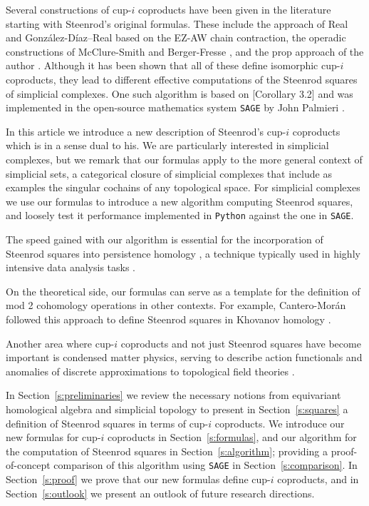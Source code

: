 Several constructions of cup-$i$ coproducts have been given in the literature starting with Steenrod's original formulas.
These include the approach of Real \cite{real1996computability} and Gonz\'alez-D\'iaz--Real \cite{gonzalez1999combinatorial, gonzalez2003computation, gonzalez2005hpt} based on the EZ-AW chain contraction, the operadic constructions of McClure-Smith \cite{mcclure03cochain} and Berger-Fresse \cite{berger04combinatorial}, and the prop approach of the author \cite{medina2020prop1, medina2018prop2}.
Although it has been shown \cite{medina2018axiomatic} that all of these define isomorphic cup-$i$ coproducts, they lead to different effective computations of the Steenrod squares of simplicial complexes.
One such algorithm is based on \cite{gonzalez1999combinatorial}[Corollary 3.2] and was implemented in the open-source mathematics system \verb|SAGE| by John Palmieri \cite{sagemath}.

In this article we introduce a new description of Steenrod's cup-$i$ coproducts which is in a sense dual to his.
We are particularly interested in simplicial complexes, but we remark that our formulas apply to the more general context of simplicial sets, a categorical closure of simplicial complexes that include as examples the singular cochains of any topological space.
For simplicial complexes we use our formulas to introduce a new algorithm computing Steenrod squares, and loosely test it performance implemented in \verb|Python| against the one in \verb|SAGE|.

The speed gained with our algorithm is essential for the incorporation of Steenrod squares into persistence homology \cite{medina2018persistence}, a technique typically used in highly intensive data analysis tasks \cite{carlsson2009topology, lee2018nanoporous, bauer2019ripser, medina2020giottotda}.

On the theoretical side, our formulas can serve as a template for the definition of mod 2 cohomology operations in other contexts.
For example, Cantero-Mor\'an followed this approach to define Steenrod squares in Khovanov homology \cite{cantero2020khovanov}.

Another area where cup-$i$ coproducts and not just Steenrod squares have become important is condensed matter physics, serving to describe action functionals and anomalies of discrete approximations to topological field theories \cite{gaiotto2016spin, bhardwaj2017state, kapustin2017fermionic}.

In Section~\ref{s:preliminaries} we review the necessary notions from equivariant homological algebra and simplicial topology to present in Section~\ref{s:squares} a definition of Steenrod squares in terms of cup-$i$ coproducts.
We introduce our new formulas for cup-$i$ coproducts in Section~\ref{s:formulas}, and our algorithm for the computation of Steenrod squares in Section~\ref{s:algorithm}; providing a proof-of-concept comparison of this algorithm using \verb|SAGE| in Section~\ref{s:comparison}.
In Section~\ref{s:proof} we prove that our new formulas define cup-$i$ coproducts, and in Section~\ref{s:outlook} we present an outlook of future research directions.